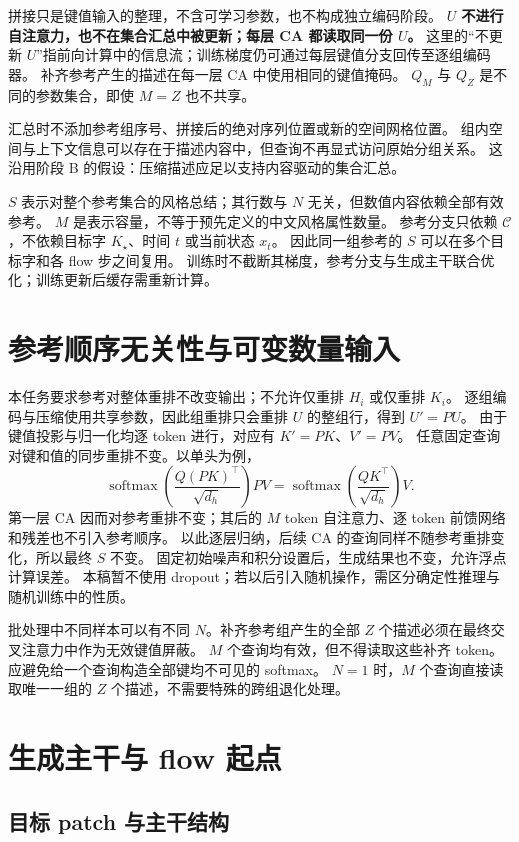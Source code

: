 \documentclass[UTF8,fontset=fandol,zihao=5,a4paper]{ctexart}
\begin{document}
拼接只是键值输入的整理，不含可学习参数，也不构成独立编码阶段。
\textbf{$U$ 不进行自注意力，也不在集合汇总中被更新；每层 CA 都读取同一份 $U$。}
这里的“不更新 $U$”指前向计算中的信息流；训练梯度仍可通过每层键值分支回传至逐组编码器。
补齐参考产生的描述在每一层 CA 中使用相同的键值掩码。
$Q_M$ 与 $Q_Z$ 是不同的参数集合，即使 $M=Z$ 也不共享。

汇总时不添加参考组序号、拼接后的绝对序列位置或新的空间网格位置。
组内空间与上下文信息可以存在于描述内容中，但查询不再显式访问原始分组关系。
这沿用阶段 B 的假设：压缩描述应足以支持内容驱动的集合汇总。

$S$ 表示对整个参考集合的风格总结；其行数与 $N$ 无关，但数值内容依赖全部有效参考。
$M$ 是表示容量，不等于预先定义的中文风格属性数量。
参考分支只依赖 $\mathcal C$，不依赖目标字 $K_\star$、时间 $t$ 或当前状态 $x_t$。
因此同一组参考的 $S$ 可以在多个目标字和各 flow 步之间复用。
训练时不截断其梯度，参考分支与生成主干联合优化；训练更新后缓存需重新计算。

\section{参考顺序无关性与可变数量输入}

本任务要求参考对整体重排不改变输出；不允许仅重排 $H_i$ 或仅重排 $K_i$。
逐组编码与压缩使用共享参数，因此组重排只会重排 $U$ 的整组行，得到 $U'=PU$。
由于键值投影与归一化均逐 token 进行，对应有 $K'=PK$、$V'=PV$。
任意固定查询对键和值的同步重排不变。以单头为例，
\[
\operatorname{softmax}\!\left(\frac{Q(PK)^\top}{\sqrt{d_h}}\right)PV
=\operatorname{softmax}\!\left(\frac{QK^\top}{\sqrt{d_h}}\right)V.
\]
第一层 CA 因而对参考重排不变；其后的 $M$ token 自注意力、逐 token 前馈网络和残差也不引入参考顺序。
以此逐层归纳，后续 CA 的查询同样不随参考重排变化，所以最终 $S$ 不变。
固定初始噪声和积分设置后，生成结果也不变，允许浮点计算误差。
本稿暂不使用 dropout；若以后引入随机操作，需区分确定性推理与随机训练中的性质。

批处理中不同样本可以有不同 $N$。补齐参考组产生的全部 $Z$ 个描述必须在最终交叉注意力中作为无效键值屏蔽。
$M$ 个查询均有效，但不得读取这些补齐 token。
应避免给一个查询构造全部键均不可见的 softmax。
$N=1$ 时，$M$ 个查询直接读取唯一一组的 $Z$ 个描述，不需要特殊的跨组退化处理。

\section{生成主干与 flow 起点}

\subsection{目标 patch 与主干结构}
\end{document}
